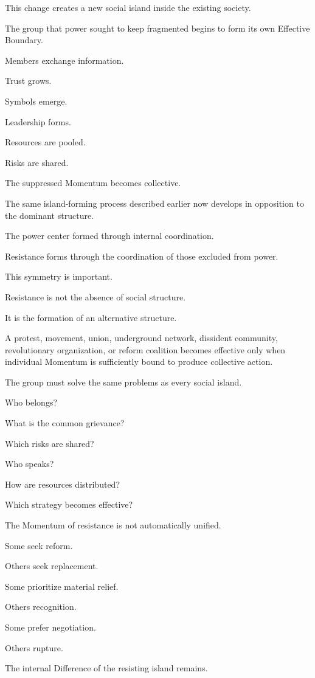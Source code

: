 This change creates a new social island inside the existing society.

The group that power sought to keep fragmented begins to form its own Effective Boundary.

Members exchange information.

Trust grows.

Symbols emerge.

Leadership forms.

Resources are pooled.

Risks are shared.

The suppressed Momentum becomes collective.

The same island-forming process described earlier now develops in opposition to the dominant structure.

The power center formed through internal coordination.

Resistance forms through the coordination of those excluded from power.

This symmetry is important.

Resistance is not the absence of social structure.

It is the formation of an alternative structure.

A protest, movement, union, underground network, dissident community, revolutionary organization, or reform coalition becomes effective only when individual Momentum is sufficiently bound to produce collective action.

The group must solve the same problems as every social island.

Who belongs?

What is the common grievance?

Which risks are shared?

Who speaks?

How are resources distributed?

Which strategy becomes effective?

The Momentum of resistance is not automatically unified.

Some seek reform.

Others seek replacement.

Some prioritize material relief.

Others recognition.

Some prefer negotiation.

Others rupture.

The internal Difference of the resisting island remains.

